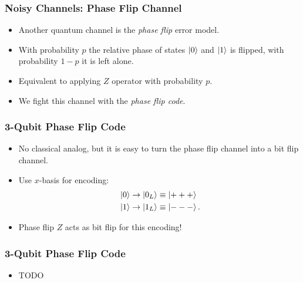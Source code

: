 \documentclass{beamer}
\begin{document}


\begin{frame}
    \frametitle{Noisy Channels: Phase Flip Channel}
    \begin{itemize}
        \item Another quantum channel is the \textit{phase flip} error model.
        \item With probability $p$ the relative phase of states $\left\vert{0}\right\rangle$ and $\left\vert{1}\right\rangle$ is flipped, with probability $1-p$ it is left alone.
        \item Equivalent to applying $Z$ operator with probability $p$.
        \item We fight this channel with the \textit{phase flip code}.
    \end{itemize}
\end{frame}

\begin{frame}
    \frametitle{3-Qubit Phase Flip Code}
    \begin{itemize}
        \item No classical analog, but it is easy to turn the phase flip channel into a bit flip channel.
        \item Use $x$-basis for encoding:
        \begin{align*}
            &\left\vert{0}\right\rangle \rightarrow \left\vert{0_L}\right\rangle \equiv \left\vert{+++}\right\rangle \\
            &\left\vert{1}\right\rangle \rightarrow \left\vert{1_L}\right\rangle \equiv \left\vert{---}\right\rangle.
        \end{align*}    
        \item Phase flip $Z$ acts as bit flip for this encoding!

    \end{itemize}
\end{frame}

\begin{frame}
    \frametitle{3-Qubit Phase Flip Code}
    \begin{itemize}
        \item TODO

    \end{itemize}
\end{frame}
\end{document}
